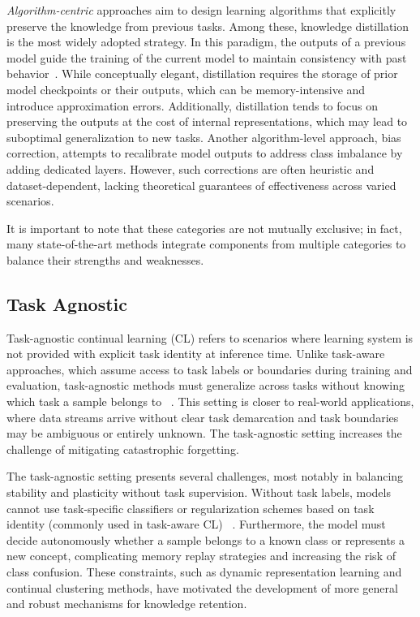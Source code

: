 \documentclass[letterpaper]{article} %
\begin{document}
\textit{Algorithm-centric} approaches aim to design learning algorithms that explicitly preserve the knowledge from previous tasks. Among these, knowledge distillation is the most widely adopted strategy. In this paradigm, the outputs of a previous model guide the training of the current model to maintain consistency with past behavior~\cite{Rebuffi:2007, tcil, ucir, podnet}. While conceptually elegant, distillation requires the storage of prior model checkpoints or their outputs, which can be memory-intensive and introduce approximation errors. Additionally, distillation tends to focus on preserving the outputs at the cost of internal representations, which may lead to suboptimal generalization to new tasks. Another algorithm-level approach, bias correction, attempts to recalibrate model outputs to address class imbalance by adding dedicated layers. However, such corrections are often heuristic and dataset-dependent, lacking theoretical guarantees of effectiveness across varied scenarios.

It is important to note that these categories are not mutually exclusive; in fact, many state-of-the-art methods integrate components from multiple categories to balance their strengths and weaknesses.

\subsection{Task Agnostic}
Task-agnostic continual learning (CL) refers to scenarios where learning system is not provided with explicit task identity at inference time. Unlike task-aware approaches, which assume access to task labels or boundaries during training and evaluation, task-agnostic methods must generalize across tasks without knowing which task a sample belongs to ~\cite{farajtabar2020orthogonal}. This setting is closer to real-world applications, where data streams arrive without clear task demarcation and task boundaries may be ambiguous or entirely unknown. The task-agnostic setting increases the challenge of mitigating catastrophic forgetting.

The task-agnostic setting presents several challenges, most notably in balancing stability and plasticity without task supervision. Without task labels, models cannot use task-specific classifiers or regularization schemes based on task identity (commonly used in task-aware CL) ~\cite{aljundi2019taskfree}. Furthermore, the model must decide autonomously whether a sample belongs to a known class or represents a new concept, complicating memory replay strategies and increasing the risk of class confusion. These constraints, such as dynamic representation learning and continual clustering methods, have motivated the development of more general and robust mechanisms for knowledge retention.
\end{document}
